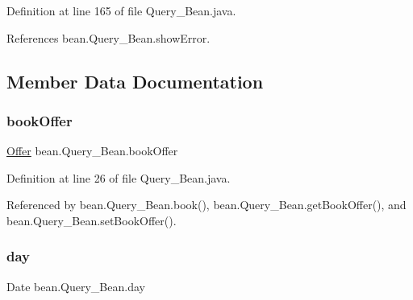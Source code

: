 Definition at line 165 of file Query\+\_\+\+Bean.\+java.


\begin{DoxyCode}{0}

\end{DoxyCode}


References bean.\+Query\+\_\+\+Bean.\+show\+Error.



\subsection{Member Data Documentation}
\mbox{\label{classbean_1_1Query__Bean_ab3019b29aceba9be1d718c06f02efbf0}} 
\subsubsection{\texorpdfstring{bookOffer}{bookOffer}}
{\footnotesize\ttfamily \mbox{\hyperlink{classdomain_1_1Offer}{Offer}} bean.\+Query\+\_\+\+Bean.\+book\+Offer\hspace{0.3cm}{\ttfamily [package]}}



Definition at line 26 of file Query\+\_\+\+Bean.\+java.



Referenced by bean.\+Query\+\_\+\+Bean.\+book(), bean.\+Query\+\_\+\+Bean.\+get\+Book\+Offer(), and bean.\+Query\+\_\+\+Bean.\+set\+Book\+Offer().

\mbox{\label{classbean_1_1Query__Bean_a84d256eca7a4f868d77e549b82d87ddf}} 
\subsubsection{\texorpdfstring{day}{day}}
{\footnotesize\ttfamily Date bean.\+Query\+\_\+\+Bean.\+day\hspace{0.3cm}{\ttfamily [package]}}



